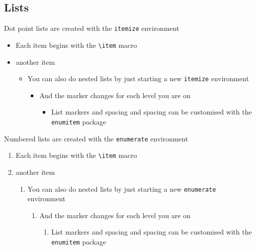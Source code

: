 \documentclass[11pt, twoside]{article}
\begin{document}
\subsection{Lists}

\label{sec:lists}
Dot point lists are created with the \lstinline{itemize} environment
\begin{itemize}
    \item Each item begins with the \lstinline{\item} macro
    \item another item
          \begin{itemize}
              \item You can also do nested lists by just starting a new \lstinline{itemize} environment
                    \begin{itemize}
                        \item And the marker changes for each level you are on
                              \begin{itemize}
                                  \item List markers and spacing and spacing can be customised with the \lstinline{enumitem} package
                              \end{itemize}
                    \end{itemize}
          \end{itemize}
\end{itemize}


Numbered lists are created with the \lstinline{enumerate} environment
\begin{enumerate}
    \item Each item begins with the \lstinline{\item} macro
    \item another item
          \begin{enumerate}
              \item You can also do nested lists by just starting a new \lstinline{enumerate} environment
                    \begin{enumerate}
                        \item And the marker changes for each level you are on
                              \begin{enumerate}
                                  \item List markers and spacing and spacing can be customised with the \lstinline{enumitem} package
                              \end{enumerate}
                    \end{enumerate}
          \end{enumerate}
\end{enumerate}
\end{document}
